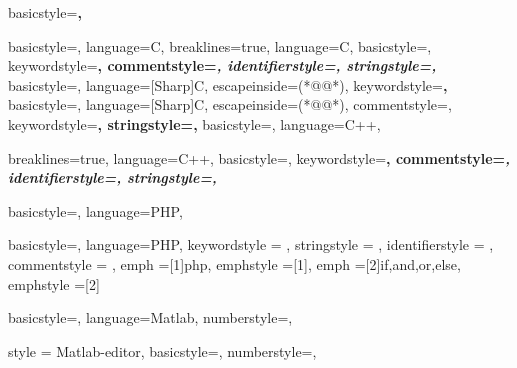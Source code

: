 \captionsetup[lstlisting]{format=listing,labelfont=white,textfont=white,font= scriptsize}


	{
	basicstyle=\scriptsize\bfseries\ttfamily,
	}
   
	{
	basicstyle=\scriptsize,
	language=C,
	}
	{
  	breaklines=true,
  	language=C,
  	basicstyle=\scriptsize,
  	keywordstyle=\bfseries\color{green!40!black},
  	commentstyle=\itshape\color{purple!40!black},
  	identifierstyle=\color{blue},
  	stringstyle=\color{orange},
    }
	{
	basicstyle=\scriptsize,
	language=[Sharp]C,
	escapeinside={(*@}{@*)},
	keywordstyle=\bfseries,
	}
	{
	basicstyle=\scriptsize,
	language=[Sharp]C,
	escapeinside={(*@}{@*)},
	commentstyle=\color{greencomments},
	keywordstyle=\color{bluekeywords}\bfseries,
	stringstyle=\color{redstrings},
	}
	{
	basicstyle=\scriptsize,
	language=C++,
 	}
 	
	{
  	breaklines=true,
  	language=C++,
  	basicstyle=\scriptsize,
  	keywordstyle=\bfseries\color{green!40!black},
  	commentstyle=\itshape\color{purple!40!black},
  	identifierstyle=\color{blue},
  	stringstyle=\color{orange},
    }
    
	{
	basicstyle=\scriptsize,
	language=PHP,
	}
	
	{
	basicstyle=\scriptsize,
	language=PHP,
	keywordstyle    = \color{dkblue},
  	stringstyle     = \color{red},
  	identifierstyle = \color{dkgreen},
  	commentstyle    = \color{gray},
  	emph            =[1]{php},
  	emphstyle       =[1]\color{black},
  	emph            =[2]{if,and,or,else},
  	emphstyle       =[2]\color{dkyellow}
  }
  
	{
	basicstyle=\scriptsize,
	language=Matlab,
	numberstyle=\tiny\ttfamily\color{gray75},
	}
	
	{
	style = Matlab-editor,
	basicstyle=\scriptsize,
	numberstyle=\tiny\ttfamily\color{gray75},
	}
	
